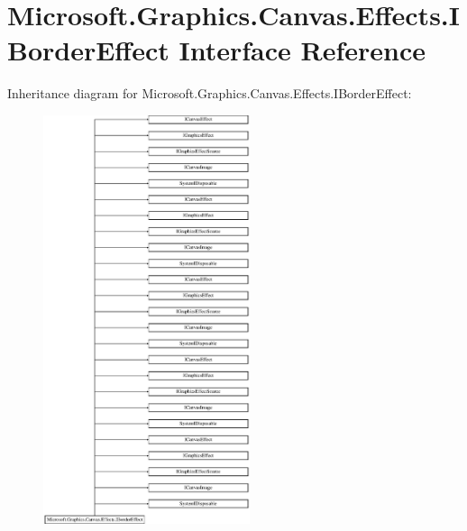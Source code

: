 \hypertarget{interface_microsoft_1_1_graphics_1_1_canvas_1_1_effects_1_1_i_border_effect}{}\section{Microsoft.\+Graphics.\+Canvas.\+Effects.\+I\+Border\+Effect Interface Reference}
\label{interface_microsoft_1_1_graphics_1_1_canvas_1_1_effects_1_1_i_border_effect}
Inheritance diagram for Microsoft.\+Graphics.\+Canvas.\+Effects.\+I\+Border\+Effect\+:\begin{figure}[H]
\begin{center}
\leavevmode
\includegraphics[height=12.000000cm]{interface_microsoft_1_1_graphics_1_1_canvas_1_1_effects_1_1_i_border_effect}
\end{center}
\end{figure}
